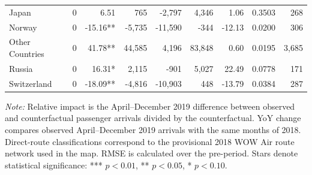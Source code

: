 \begin{table}
\begin{tabular}{llrrrrrrr}
Japan & 0 & 6.51 & 765 & -2,797 & 4,346 & 1.06 & 0.3503 & 268 \\
Norway & 0 & -15.16** & -5,735 & -11,590 & -344 & -12.13 & 0.0200 & 306 \\
Other Countries & 0 & 41.78** & 44,585 & 4,196 & 83,848 & 0.60 & 0.0195 & 3,685 \\
Russia & 0 & 16.31* & 2,115 & -901 & 5,027 & 22.49 & 0.0778 & 171 \\
Switzerland & 0 & -18.09** & -4,816 & -10,903 & 448 & -13.79 & 0.0384 & 287 \\
\bottomrule
\end{tabular}
\begin{minipage}{\textheight}
\raggedright\scriptsize \textit{Note:} Relative impact is the April--December 2019 difference between observed and counterfactual passenger arrivals divided by the counterfactual. YoY change compares observed April--December 2019 arrivals with the same months of 2018. Direct-route classifications correspond to the provisional 2018 WOW Air route network used in the map. RMSE is calculated over the pre-period. Stars denote statistical significance: *** $p<0.01$, ** $p<0.05$, * $p<0.10$.
\end{minipage}
\end{table}
